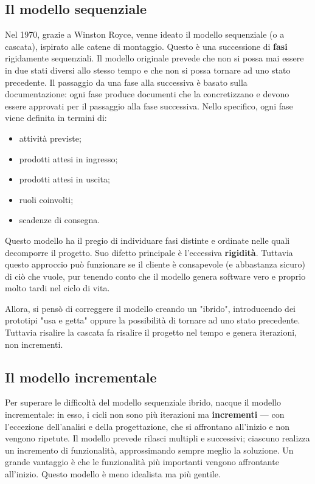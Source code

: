 \documentclass[a4paper]{article}
\begin{document}
		
	\subsection{Il modello sequenziale}

		
Nel 1970, grazie a Winston Royce, venne ideato il modello sequenziale (o a cascata), ispirato alle catene di montaggio. Questo è una successione di \textbf{fasi} rigidamente sequenziali. Il modello originale prevede che non si possa mai essere in due stati diversi allo stesso tempo e che non si possa tornare ad uno stato precedente. Il passaggio da una fase alla successiva è basato sulla documentazione: ogni fase produce documenti che la concretizzano e devono essere approvati per il passaggio alla fase successiva. Nello specifico, ogni fase viene definita in termini di:
		
	\begin{itemize}
		
			
	\item attività previste;
			
	\item prodotti attesi in ingresso;
			
	\item prodotti attesi in uscita;
			
	\item ruoli coinvolti;
			
	\item scadenze di consegna.
		
	\end{itemize}

		
Questo modello ha il pregio di individuare fasi distinte e ordinate nelle quali decomporre il progetto. Suo difetto principale è l'eccessiva \textbf{rigidità}. Tuttavia questo approccio può funzionare se il cliente è consapevole (e abbastanza sicuro) di ciò che vuole, pur tenendo conto che il modello genera software vero e proprio molto tardi nel ciclo di vita.
		
Allora, si pensò di correggere il modello creando un "ibrido", introducendo dei prototipi "usa e getta" oppure la possibilità di tornare ad uno stato precedente. Tuttavia risalire la cascata fa risalire il progetto nel tempo e genera iterazioni, non incrementi.

		
	\subsection{Il modello incrementale}

		
Per superare le difficoltà del modello sequenziale ibrido, nacque il modello incrementale: in esso, i cicli non sono più iterazioni ma \textbf{incrementi} --- con l'eccezione dell'analisi e della progettazione, che si affrontano all'inizio e non vengono ripetute. Il modello prevede rilasci multipli e successivi; ciascuno realizza un incremento di funzionalità, approssimando sempre meglio la soluzione. Un grande vantaggio è che le funzionalità più importanti vengono affrontante all'inizio. Questo modello è meno idealista ma più gentile.
\end{document}
